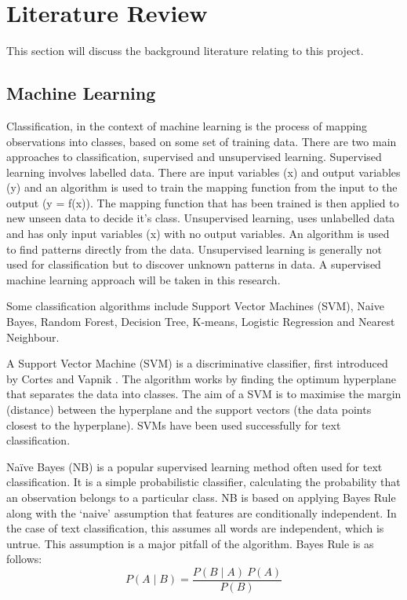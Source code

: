 \chapter{Literature Review}

This section will discuss the background literature relating to this project.

\section{Machine Learning}

Classification, in the context of machine learning is the process of mapping observations into classes, based on some set of training data. There are two main approaches to classification, supervised and unsupervised learning. Supervised learning involves labelled data. There are input variables (x) and output variables (y) and an algorithm is used to train the mapping function from the input to the output (y = f(x)). The mapping function that has been trained is then applied to new unseen data to decide it's class. Unsupervised learning, uses unlabelled data and has only input variables (x) with no output variables. An algorithm is used to find patterns directly from the data. Unsupervised learning is generally not used for classification but to discover unknown patterns in data. A supervised machine learning approach will be taken in this research.

Some classification algorithms include Support Vector Machines (SVM), Naive Bayes, Random Forest, Decision Tree, K-means, Logistic Regression and Nearest Neighbour.

A Support Vector Machine (SVM) is a discriminative classifier, first introduced by Cortes and Vapnik \cite{Vapnik1995,Vapnik21995}. The algorithm works by finding the optimum hyperplane that separates the data into classes. The aim of a SVM is to maximise the margin (distance) between the hyperplane and the support vectors (the data points closest to the hyperplane). SVMs have been used successfully for text classification.

Naïve Bayes (NB) is a popular supervised learning method often used for text classification. It is a simple probabilistic classifier, calculating the probability that an observation belongs to a particular class. NB is based on applying Bayes Rule along with the ‘naive’ assumption that features are conditionally independent. In the case of text classification, this assumes all words are independent, which is untrue. This assumption is a major pitfall of the algorithm. Bayes Rule is as follows:  \[P(A\mid B)=\frac{P(B\mid A)\:P(A)}{P(B)}\] 

